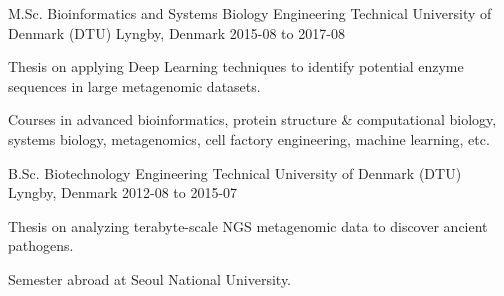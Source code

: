 


\begin{cventries}


\cventry
{M.Sc. Bioinformatics and Systems Biology Engineering} %
{Technical University of Denmark (DTU)} %
{Lyngby, Denmark} %
{2015-08 to 2017-08} %
{ %
\begin{cvitems}
\item {Thesis on applying Deep Learning techniques to identify potential enzyme sequences in large metagenomic datasets.}
\item {Courses in advanced bioinformatics, protein structure \& computational biology, systems biology, metagenomics, cell factory engineering, machine learning, etc.}
\end{cvitems}
}

\cventry
{B.Sc. Biotechnology Engineering} %
{Technical University of Denmark (DTU)} %
{Lyngby, Denmark} %
{2012-08 to 2015-07} %
{ %
\begin{cvitems}
\item {Thesis on analyzing terabyte-scale NGS metagenomic data to discover ancient pathogens.}
\item {Semester abroad at Seoul National University.}
\end{cvitems}
}


\end{cventries}